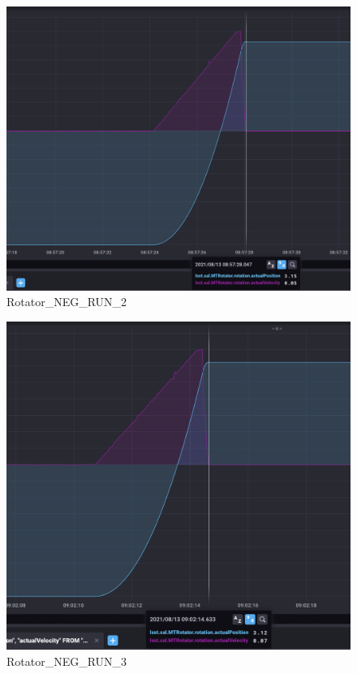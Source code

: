 \documentclass[SE,authoryear,toc, lsstdraft]{lsstdoc}
\begin{document}
\begin{figure}
  \includegraphics[width=\linewidth]{media/rotator_neg_2.png}
  \caption{Rotator\_NEG\_RUN\_2}
  \label{fig:Rotator_NEG_RUN_2}
\end{figure}

\begin{figure}
  \includegraphics[width=\linewidth]{media/rotator_neg_3.png}
  \caption{Rotator\_NEG\_RUN\_3}
  \label{fig:Rotator_NEG_RUN_3}
\end{figure}
\end{document}
